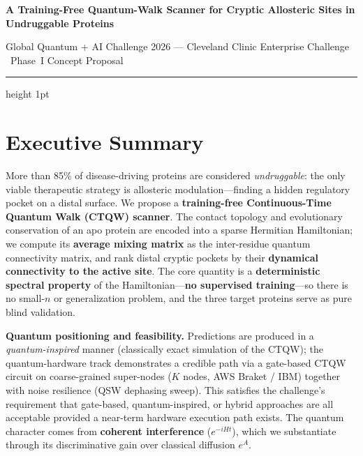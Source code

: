 \documentclass[11pt,a4paper]{article}
\newcommand{\lead}[1]{\textbf{#1}}
\begin{document}
\pagestyle{empty}

{\LARGE\bfseries\color{black} A Training-Free Quantum-Walk Scanner for Cryptic Allosteric Sites in Undruggable Proteins\par}
\vspace{3pt}
{\color{grey} Global Quantum + AI Challenge 2026 --- Cleveland Clinic Enterprise Challenge \textperiodcentered\ Phase~I Concept Proposal\par}
\vspace{6pt}
\hrule height 1pt
\vspace{8pt}

\section{Executive Summary}
More than 85\% of disease-driving proteins are considered \emph{undruggable}: the only viable therapeutic strategy is allosteric modulation---finding a hidden regulatory pocket on a distal surface. We propose a \lead{training-free Continuous-Time Quantum Walk (CTQW) scanner}. The contact topology and evolutionary conservation of an apo protein are encoded into a sparse Hermitian Hamiltonian; we compute its \lead{average mixing matrix} as the inter-residue quantum connectivity matrix, and rank distal cryptic pockets by their \lead{dynamical connectivity to the active site}. The core quantity is a \lead{deterministic spectral property} of the Hamiltonian---\lead{no supervised training}---so there is no small-$n$ or generalization problem, and the three target proteins serve as pure blind validation.

\smallskip
\lead{Quantum positioning and feasibility.} Predictions are produced in a \emph{quantum-inspired} manner (classically exact simulation of the CTQW); the quantum-hardware track demonstrates a credible path via a gate-based CTQW circuit on coarse-grained super-nodes ($K$ nodes, AWS Braket / IBM) together with noise resilience (QSW dephasing sweep). This satisfies the challenge's requirement that gate-based, quantum-inspired, or hybrid approaches are all acceptable provided a near-term hardware execution path exists. The quantum character comes from \lead{coherent interference} ($e^{-iHt}$), which we substantiate through its discriminative gain over classical diffusion $e^{A}$.

\end{document}
